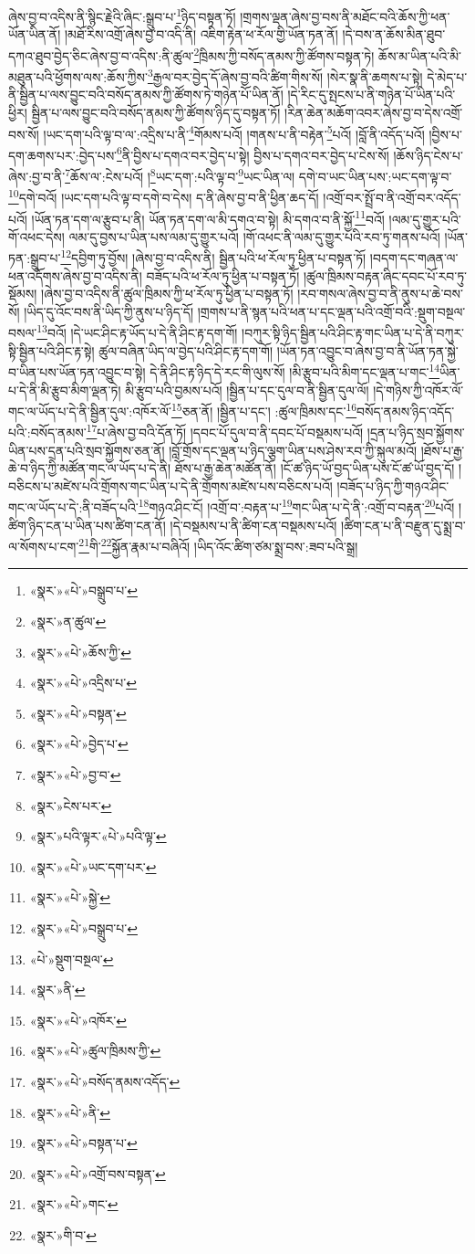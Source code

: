 ཞེས་བྱ་བ་འདིས་ནི་སྙིང་རྗེའི་ཞིང་:སྒྲུབ་པ་\footnote{«སྣར་»«པེ་»བསྒྲུབ་པ་}ཉིད་བསྟན་ཏོ། །གྲགས་ལྡན་ཞེས་བྱ་བས་ནི་མཐོང་བའི་ཆོས་ཀྱི་ཕན་ཡོན་ཡིན་ནོ། །མཐོ་རིས་འགྲོ་ཞེས་བྱ་བ་འདི་ནི། འཇིག་རྟེན་ཕ་རོལ་གྱི་ཡོན་ཏན་ནོ། །དེ་བས་ན་ཆོས་མིན་ཐུབ་དཀའ་ཐུབ་བྱེད་ཅིང་ཞེས་བྱ་བ་འདིས་:ནི་ཚུལ་\footnote{«སྣར་»ན་ཚུལ་}ཁྲིམས་ཀྱི་བསོད་ནམས་ཀྱི་ཚོགས་བསྟན་ཏེ། ཆོས་མ་ཡིན་པའི་མི་མཐུན་པའི་ཕྱོགས་ལས་:ཆོས་ཀྱིས་\footnote{«སྣར་»«པེ་»ཆོས་ཀྱི་}རྒྱལ་བར་བྱེད་དོ་ཞེས་བྱ་བའི་ཚིག་གིས་སོ། །སེར་སྣ་ནི་ཆགས་པ་སྟེ། དེ་མེད་པ་ནི་སྦྱིན་པ་ལས་བྱུང་བའི་བསོད་ནམས་ཀྱི་ཚོགས་ཏེ་གཉེན་པོ་ཡིན་ནོ། །དེ་རིང་དུ་སྤངས་པ་ནི་གཉེན་པོ་ཡིན་པའི་ཕྱིར། སྦྱིན་པ་ལས་བྱུང་བའི་བསོད་ནམས་ཀྱི་ཚོགས་ཉིད་དུ་བསྟན་ཏོ། །རིན་ཆེན་མཆོག་འབར་ཞེས་བྱ་བ་དེས་འགྲོ་བས་སོ། །ཡང་དག་པའི་ལྟ་བ་ལ་:འདྲིས་པ་ནི་\footnote{«སྣར་»«པེ་»འདྲིས་པ་}གོམས་པའོ། །གནས་པ་ནི་བརྟེན་\footnote{«སྣར་»«པེ་»བསྟན་}པའོ། །བློ་ནི་འདོད་པའོ། །བྱིས་པ་དག་ཆགས་པར་:བྱེད་པས་\footnote{«སྣར་»«པེ་»བྱེད་པ་}ནི་བྱིས་པ་དགའ་བར་བྱེད་པ་སྟེ། བྱིས་པ་དགའ་བར་བྱེད་པ་ངེས་སོ། །ཆོས་ཉིད་ངེས་པ་ཞེས་:བྱ་བ་ནི་\footnote{«སྣར་»«པེ་»བྱ་བ་}ཆོས་ལ་:ངེས་པའོ། །\footnote{«སྣར་»ངེས་པར་}ཡང་དག་:པའི་ལྟ་བ་\footnote{«སྣར་»པའི་ལྟར་«པེ་»པའི་ལྟ་}ཡང་ཡིན་ལ། དགེ་བ་ཡང་ཡིན་པས་:ཡང་དག་ལྟ་བ་\footnote{«སྣར་»«པེ་»ཡང་དག་པར་}དགེ་བའོ། །ཡང་དག་པའི་ལྟ་བ་དགེ་བ་དེས། ད་ནི་ཞེས་བྱ་བ་ནི་ཕྱིན་ཆད་དོ། །འགྲོ་བར་སྤྲོ་བ་ནི་འགྲོ་བར་འདོད་པའོ། །ཡོན་ཏན་དག་ལ་རྩུབ་པ་ནི། ཡོན་ཏན་དག་ལ་མི་དགའ་བ་སྟེ། མི་དགའ་བ་ནི་སྐྱོ་\footnote{«སྣར་»«པེ་»སྐྱེ་}བའོ། །ལམ་དུ་གྱུར་པའི་གོ་འཕང་དེས། ལམ་དུ་བྱས་པ་ཡིན་པས་ལམ་དུ་གྱུར་པའོ། །གོ་འཕང་ནི་ལམ་དུ་གྱུར་པའི་རབ་ཏུ་གནས་པའོ། །ཡོན་ཏན་:སྒྲུབ་པ་\footnote{«སྣར་»«པེ་»བསྒྲུབ་པ་}དབྱིག་ཏུ་བྱོས། །ཞེས་བྱ་བ་འདིས་ནི། སྦྱིན་པའི་ཕ་རོལ་ཏུ་ཕྱིན་པ་བསྟན་ཏོ། །བདག་དང་གཞན་ལ་ཕན་འདོགས་ཞེས་བྱ་བ་འདིས་ནི། བཟོད་པའི་ཕ་རོལ་ཏུ་ཕྱིན་པ་བསྟན་ཏོ། །ཚུལ་ཁྲིམས་བརྟན་ཞིང་དབང་པོ་རབ་ཏུ་སྡོམས། །ཞེས་བྱ་བ་འདིས་ནི་ཚུལ་ཁྲིམས་ཀྱི་ཕ་རོལ་ཏུ་ཕྱིན་པ་བསྟན་ཏོ། །རབ་གསལ་ཞེས་བྱ་བ་ནི་ནུས་པ་ཆེ་བས་སོ། །ཡིད་དུ་འོང་བས་ནི་ཡིད་ཀྱི་ནུས་པ་ཉིད་དོ། །གྲགས་པ་ནི་སྙན་པའི་ཕན་པ་དང་ལྡན་པའི་འགྲོ་བའི་:སྡུག་བསྔལ་བསལ་\footnote{«པེ་»སྡུག་བསྔལ་}བའོ། །དེ་ཡང་ཤིང་རྟ་ཡོད་པ་དེ་ནི་ཤིང་རྟ་དག་གོ། །བཀུར་སྟི་ཉིད་སྦྱིན་པའི་ཤིང་རྟ་གང་ཡིན་པ་དེ་ནི་བཀུར་སྟི་སྦྱིན་པའི་ཤིང་རྟ་སྟེ། ཚུལ་བཞིན་ཡིད་ལ་བྱེད་པའི་ཤིང་རྟ་དག་གོ། །ཡོན་ཏན་འབྱུང་བ་ཞེས་བྱ་བ་ནི་ཡོན་ཏན་སྐྱེ་བ་ཡིན་པས་ཡོན་ཏན་འབྱུང་བ་སྟེ། དེ་ནི་ཤིང་རྟ་ཉིད་དེ་རང་གི་ལུས་སོ། །མི་རྩུབ་པའི་མིག་དང་ལྡན་པ་གང་\footnote{«སྣར་»ནི་}ཡིན་པ་དེ་ནི་མི་རྩུབ་མིག་ལྡན་ཏེ། མི་རྩུབ་པའི་བྱམས་པའོ། །སྦྱིན་པ་དང་དུལ་བ་ནི་སྦྱིན་དུལ་ལོ། །དེ་གཉིས་ཀྱི་འཁོར་ལོ་གང་ལ་ཡོད་པ་དེ་ནི་སྦྱིན་དུལ་:འཁོར་ལོ་\footnote{«སྣར་»«པེ་»འཁོར་}ཅན་ནོ། །སྦྱིན་པ་དང་། :ཚུལ་ཁྲིམས་དང་\footnote{«སྣར་»«པེ་»ཚུལ་ཁྲིམས་ཀྱི་}བསོད་ནམས་ཉིད་འདོད་པའི་:བསོད་ནམས་\footnote{«སྣར་»«པེ་»བསོད་ནམས་འདོད་}པ་ཞེས་བྱ་བའི་དོན་ཏོ། །དབང་པོ་དུལ་བ་ནི་དབང་པོ་བསྡམས་པའོ། །དྲན་པ་ཉིད་སྲབ་སྐྱོགས་ཡིན་པས་དྲན་པའི་སྲབ་སྐྱོགས་ཅན་ནོ། །བློ་གྲོས་དང་ལྡན་པ་ཉིད་ལྕག་ཡིན་པས་ཤེས་རབ་ཀྱི་སྐུལ་མའོ། །ཐོས་པ་རྒྱ་ཆེ་བ་ཉིད་ཀྱི་མཚོན་གང་ལ་ཡོད་པ་དེ་ནི། ཐོས་པ་རྒྱ་ཆེན་མཚོན་ནོ། །ངོ་ཚ་ཉིད་ཡོ་བྱད་ཡིན་པས་ངོ་ཚ་ཡོ་བྱད་དོ། །བཅིངས་པ་མཛེས་པའི་གྲོགས་གང་ཡིན་པ་དེ་ནི་གྲོགས་མཛེས་པས་བཅིངས་པའོ། །བཟོད་པ་ཉིད་ཀྱི་གཉའ་ཤིང་གང་ལ་ཡོད་པ་དེ་:ནི་བཟོད་པའི་\footnote{«སྣར་»«པེ་»ནི་}གཉའ་ཤིང་ངོ། །འགྲོ་བ་:བརྟན་པ་\footnote{«སྣར་»«པེ་»བསྟན་པ་}གང་ཡིན་པ་དེ་ནི་:འགྲོ་བ་བརྟན་\footnote{«སྣར་»«པེ་»འགྲོ་བས་བསྟན་}པའོ། །ཚིག་ཉིད་ངན་པ་ཡིན་པས་ཚིག་ངན་ནོ། །དེ་བསྡམས་པ་ནི་ཚིག་ངན་བསྡམས་པའོ། །ཚིག་ངན་པ་ནི་བརྫུན་དུ་སྨྲ་བ་ལ་སོགས་པ་ངག་\footnote{«སྣར་»«པེ་»གང་}གི་\footnote{«སྣར་»གི་བ་}སྐྱོན་རྣམ་པ་བཞིའོ། །ཡིད་འོང་ཚིག་ཙམ་སྨྲ་བས་:ཟབ་པའི་སྒྲ། 